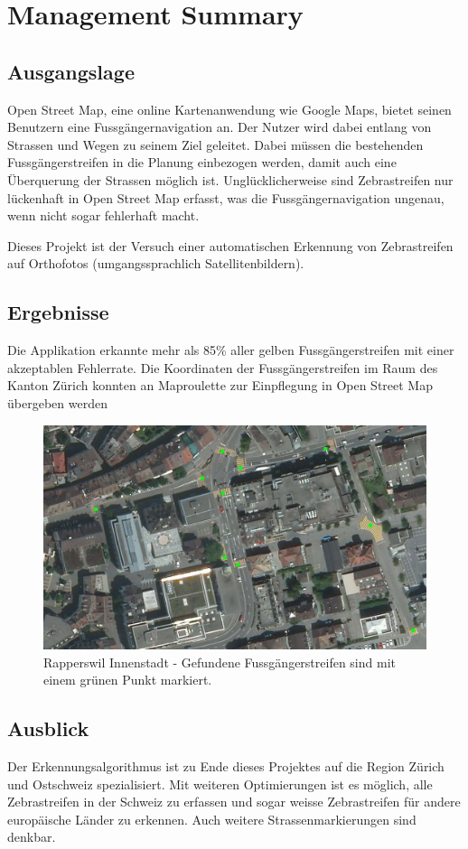\section{Management Summary}
\subsection*{Ausgangslage}
Open Street Map, eine online Kartenanwendung wie Google Maps, bietet seinen Benutzern eine Fussgängernavigation an. Der Nutzer wird dabei entlang von Strassen und Wegen zu seinem Ziel geleitet. Dabei müssen die bestehenden Fussgängerstreifen in die Planung einbezogen werden, damit auch eine Überquerung der Strassen möglich ist. Unglücklicherweise sind Zebrastreifen nur lückenhaft in Open Street Map erfasst, was die Fussgängernavigation ungenau, wenn nicht sogar fehlerhaft macht.

Dieses Projekt ist der Versuch einer automatischen Erkennung von Zebrastreifen auf Orthofotos (umgangssprachlich Satellitenbildern).

\subsection*{Ergebnisse}
Die Applikation erkannte mehr als 85\% aller gelben Fussgängerstreifen mit einer akzeptablen Fehlerrate. Die Koordinaten der Fussgängerstreifen im Raum des Kanton Zürich konnten an Maproulette zur Einpflegung in Open Street Map übergeben werden
\\
\begin{figure}[H]
	\centering
	\includegraphics[width=\textwidth -10mm]{images/boxsave_rappi.png}
	\caption[Überblick]{Rapperswil Innenstadt - Gefundene Fussgängerstreifen sind mit einem grünen Punkt markiert.}
\end{figure}
\subsection*{Ausblick}
Der Erkennungsalgorithmus ist zu Ende dieses Projektes auf die Region Zürich und Ostschweiz spezialisiert. Mit weiteren Optimierungen ist es möglich, alle Zebrastreifen in der Schweiz zu erfassen und sogar weisse Zebrastreifen für andere europäische Länder zu erkennen. Auch weitere Strassenmarkierungen sind denkbar.